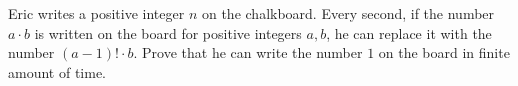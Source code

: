 Eric writes a positive integer $n$ on the chalkboard. Every second, if the number $a\cdot b$ is written on the board for positive integers $a,b$, he can replace it with the number $(a-1)!\cdot b$. Prove that he can write the number $1$ on the board in finite amount of time.